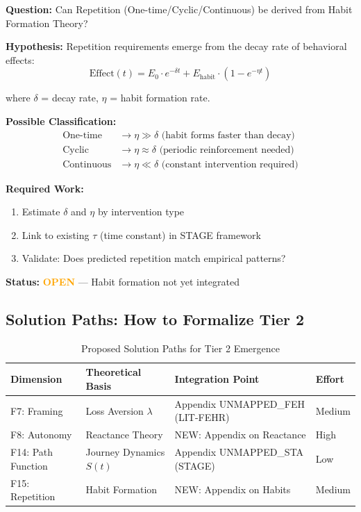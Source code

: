 \begin{tcolorbox}[colback=yellow!5!white, colframe=yellow!75!black,
    title=\textbf{Research Question RQ-4: Repetition Emergence (F15)}]

\textbf{Question:} Can Repetition (One-time/Cyclic/Continuous) be derived from Habit Formation Theory?

\textbf{Hypothesis:} Repetition requirements emerge from the decay rate of behavioral effects:
\begin{equation}
\text{Effect}(t) = E_0 \cdot e^{-\delta t} + E_{\text{habit}} \cdot (1 - e^{-\eta t})
\end{equation}

where $\delta$ = decay rate, $\eta$ = habit formation rate.

\textbf{Possible Classification:}
\begin{align}
\text{One-time} &\rightarrow \eta \gg \delta \text{ (habit forms faster than decay)} \\
\text{Cyclic} &\rightarrow \eta \approx \delta \text{ (periodic reinforcement needed)} \\
\text{Continuous} &\rightarrow \eta \ll \delta \text{ (constant intervention required)}
\end{align}

\textbf{Required Work:}
\begin{enumerate}[nosep]
    \item Estimate $\delta$ and $\eta$ by intervention type
    \item Link to existing $\tau$ (time constant) in STAGE framework
    \item Validate: Does predicted repetition match empirical patterns?
\end{enumerate}

\textbf{Status:} \textcolor{orange}{\textbf{OPEN}} --- Habit formation not yet integrated
\end{tcolorbox}

\subsection{Solution Paths: How to Formalize Tier 2}

\begin{table}[htbp]
\centering
\caption{Proposed Solution Paths for Tier 2 Emergence}
\label{tab:hhh-solution-paths}
\renewcommand{\arraystretch}{1.3}
\small
\begin{tabular}{@{}llll@{}}
\toprule
\textbf{Dimension} & \textbf{Theoretical Basis} & \textbf{Integration Point} & \textbf{Effort} \\
\midrule
F7: Framing & Loss Aversion $\lambda$ & Appendix UNMAPPED_FEH (LIT-FEHR) & Medium \\
F8: Autonomy & Reactance Theory & NEW: Appendix on Reactance & High \\
F14: Path Function & Journey Dynamics $S(t)$ & Appendix UNMAPPED_STA (STAGE) & Low \\
F15: Repetition & Habit Formation & NEW: Appendix on Habits & Medium \\
\bottomrule
\end{tabular}
\end{table}

